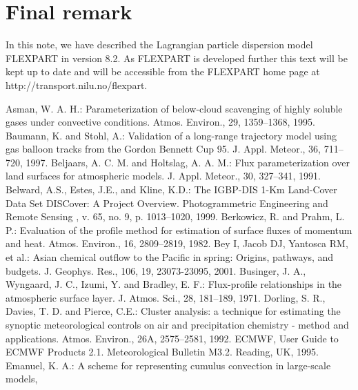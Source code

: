 \documentclass{egu}            %
\begin{document}
\section{Final remark}

In this note, we have described the Lagrangian particle dispersion model FLEXPART in version
8.2.  As FLEXPART is developed further this text will be kept up to date and will be accessible
from the FLEXPART home page at http://transport.nilu.no/flexpart.

\begin{thebibliography}{}

Asman, W. A. H.:
Parameterization of below-cloud scavenging of highly soluble gases under convective conditions.
Atmos. Environ., 29, 1359--1368, 1995.
Baumann, K. and Stohl, A.:
Validation of a long-range trajectory model using gas balloon tracks from the Gordon Bennett Cup 95.
J. Appl. Meteor., 36, 711--720, 1997.
Beljaars, A. C. M. and Holtslag, A. A. M.:
Flux parameterization over land surfaces for atmospheric models.
J. Appl. Meteor., 30, 327--341, 1991.
Belward, A.S., Estes, J.E., and Kline, K.D.: 
The IGBP-DIS 1-Km Land-Cover Data Set DISCover: A Project Overview. 
Photogrammetric Engineering and Remote Sensing , v. 65, no. 9, p. 1013--1020, 1999.
Berkowicz, R. and Prahm, L. P.:
Evaluation of the profile method for estimation of surface fluxes of momentum and heat.
Atmos. Environ., 16, 2809--2819, 1982.
Bey I, Jacob DJ, Yantosca RM, et al.:
Asian chemical outflow to the Pacific in spring: Origins, pathways, and budgets.
J. Geophys. Res., 106, 19, 23073-23095, 2001.
Businger, J. A., Wyngaard, J. C., Izumi, Y. and Bradley, E. F.:
Flux-profile relationships in the atmospheric surface layer.
J. Atmos. Sci., 28, 181--189, 1971. 
 Dorling, S. R., Davies, T. D. and Pierce, C.E.:
Cluster analysis: a technique for estimating the synoptic meteorological controls on air and precipitation chemistry - method and applications.
Atmos. Environ., 26A, 2575--2581, 1992.
ECMWF,
User Guide to ECMWF Products 2.1. Meteorological Bulletin M3.2. Reading, UK, 1995.
Emanuel, K. A.:
A scheme for representing cumulus convection in large-scale models,

\end{thebibliography}
\end{document}
